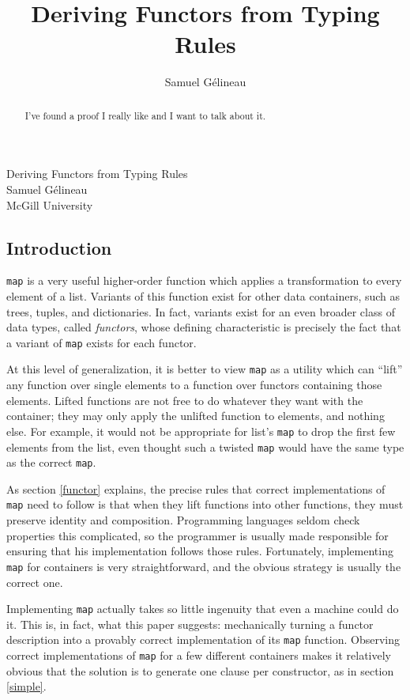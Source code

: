 \documentclass{article}
\title{Deriving Functors from Typing Rules}
\author{Samuel G\'elineau}
\begin{document}
\begin{center}
{\larger[3] Deriving Functors from Typing Rules}\\
\vspace{\bigskipamount}
{\larger Samuel G\'elineau}\\
McGill University
\end{center}

\begin{abstract}
I've found a proof I really like and I want to talk about it.
\end{abstract}

\begin{multicols}{2}
\section{Introduction}\label{intro}
\vspace{-\parskip}\hspace*{\parindent}\texttt{map} is a very useful higher-order function which applies a transformation to every element of a list. Variants of this function exist for other data containers, such as trees, tuples, and dictionaries. In fact, variants exist for an even broader class of data types, called \emph{functors}, whose defining characteristic is precisely the fact that a variant of \texttt{map} exists for each functor.

At this level of generalization, it is better to view \texttt{map} as a utility which can ``lift'' any function over single elements to a function over functors containing those elements. Lifted functions are not free to do whatever they want with the container; they may only apply the unlifted function to elements, and nothing else. For example, it would not be appropriate for list's \texttt{map} to drop the first few elements from the list, even thought such a twisted \texttt{map} would have the same type as the correct \texttt{map}.

As section \ref{functor} explains, the precise rules that correct implementations of \texttt{map} need to follow is that when they lift functions into other functions, they must preserve identity and composition. Programming languages seldom check properties this complicated, so the programmer is usually made responsible for ensuring that his implementation follows those rules. Fortunately, implementing \texttt{map} for containers is very straightforward, and the obvious strategy is usually the correct one.

Implementing \texttt{map} actually takes so little ingenuity that even a machine could do it. This is, in fact, what this paper suggests: mechanically turning a functor description into a provably correct implementation of its \texttt{map} function. Observing correct implementations of \texttt{map} for a few different containers makes it relatively obvious that the solution is to generate one clause per constructor, as in section \ref{simple}.


\end{multicols}
\end{document}
